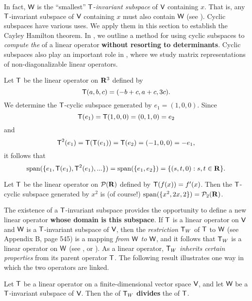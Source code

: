 \begin{remark} \label{remark 5.4.1}
In fact, \(\textsf{W}\) is the ``smallest'' \(\textsf{T}\)-\emph{invariant subspace} of \(\textsf{V}\) containing \(x\).
That is, any \(\textsf{T}\)-invariant subspace of \(\textsf{V}\) containing \(x\) must also contain \(\textsf{W}\) (see ).
Cyclic subspaces have various uses.
We apply them in this section to establish the Cayley Hamilton theorem.
In , we outline a method for using cyclic subspaces to \emph{compute the \CPOLY{}} of a linear operator \textbf{without resorting to determinants}.
Cyclic subspaces also play an important role in , where we study matrix representations of non-diagonalizable linear operators.
\end{remark}

\begin{example} \label{example 5.4.3}
Let \(\textsf{T}\) be the linear operator on \(\mathbf{R}^3\) defined by
\[
    \textsf{T}(a, b, c) = (-b + c, a + c, 3c).
\]
We determine the \(\textsf{T}\)-cyclic subspace generated by \(e_1 = (1, 0, 0)\).
Since
\[
    \textsf{T}(e_1) = \textsf{T}(1, 0, 0) = (0, 1, 0) = e_2
\]
and
\[
    \textsf{T}^2(e_1) = \textsf{T}(\textsf{T}(e_1)) = \textsf{T}(e_2) = (-1, 0, 0) = -e_1,
\]
it follows that
\[
    \operatorname{span}(\{ e_1, \textsf{T}(e_1), \textsf{T}^2(e_1), ... \}) = \operatorname{span}(\{ e_1, e_2 \}) = \{ (s, t, 0) : s, t \in \mathbf{R} \}.
\]
\end{example}

\begin{example} \label{example 5.4.4}
Let \(\textsf{T}\) be the linear operator on \(\mathcal{P}(\mathbf{R})\) defined by \(\textsf{T}(f(x)) = f'(x)\).
Then the \(\textsf{T}\)-cyclic subspace generated by \(x^2\) is (of course!) \(\operatorname{span}(\{ x^2, 2x, 2 \}) = \mathcal{P}_2(\mathbf{R})\).
\end{example}

\begin{remark} \label{remark 5.4.2}
The existence of a \(\textsf{T}\)-invariant subspace provides the opportunity to define a new linear operator \textbf{whose domain is this subspace}.
If \(\textsf{T}\) is a linear operator on \(\textsf{V}\) and \(\textsf{W}\) is a \(\textsf{T}\)-invariant subspace of \(\textsf{V}\), then the \emph{restriction} \(\textsf{T}_W\) of \(\textsf{T}\) to \(\textsf{W}\) (see Appendix B, page 545) is a mapping \emph{from \(\textsf{W}\) to \(\textsf{W}\)}, and it follows that \(\textsf{T}_W\) is a linear operator on \(\textsf{W}\) (see , or ).
As a linear operator, \(\textsf{T}_W\) \emph{inherits certain properties} from its parent operator \(\textsf{T}\).
The following result illustrates one way in which the two operators are linked.
\end{remark}

\begin{theorem} \label{thm 5.20}
Let \(\textsf{T}\) be a linear operator on a finite-dimensional vector space \(\textsf{V}\), and let \(\textsf{W}\) be a \(\textsf{T}\)-invariant subspace of \(\textsf{V}\).
Then the \CPOLY{} of \(\textsf{T}_W\) \textbf{divides} the \CPOLY{} of \(\textsf{T}\).
\end{theorem}

